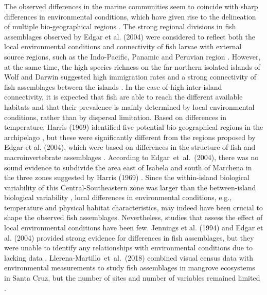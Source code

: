 \documentclass[jmse,article,accept,moreauthors,pdftex]{Definitions/mdpi}
\begin{document}
The observed differences in the marine communities seem to coincide with sharp differences in environmental conditions, which have given rise to the delineation of multiple bio-geographical regions \citep{Harris1969BreedingIslands,Jennings1994TheArchipelago}. The strong regional divisions in fish assemblages observed by Edgar et al. (2004) were considered to reflect both the local environmental conditions and connectivity of fish larvae with external source regions, such as the Indo-Pacific, Panamic and Peruvian region \cite{Edgar2004}. However, at the same time, the high species richness on the far-northern isolated islands of Wolf and Darwin suggested high immigration rates and a strong connectivity of fish assemblages between the islands \citep{Edgar2004}. In the case of high inter-island connectivity, it is expected that fish are able to reach the different available habitats and that their prevalence is mainly determined by local environmental conditions, rather than by dispersal limitation. Based on differences in temperature, Harris (1969) identified five potential bio-geographical regions in the archipelago \cite{Harris1969BreedingIslands}, but these were significantly different from the regions proposed by Edgar et al. (2004), which were based on differences in the structure of fish and macroinvertebrate assemblages \cite{Edgar2004}. According to \mbox{Edgar et al. (2004)}, there was no sound evidence to subdivide the area east of Isabela and south of Marchena in the three zones suggested by Harris (1969) \cite{Edgar2004,Harris1969BreedingIslands}. Since the within-island biological variability of this Central-Southeastern zone was larger than the between-island biological variability \citep{Edgar2004}, local differences in environmental conditions, e.g., temperature and physical habitat characteristics, may indeed have been crucial to shape the observed fish assemblages. Nevertheless, studies that assess the effect of local environmental conditions have been few. Jennings et al. (1994) and Edgar et al. (2004) provided strong evidence for differences in fish assemblages, but they were unable to identify any relationships with environmental conditions due to lacking data \cite{Edgar2004,Jennings1994TheArchipelago}. \mbox{Llerena-Martillo et al. (2018)} combined visual census data with environmental measurements to study fish assemblages in mangrove ecosystems in Santa Cruz, but the number of sites and number of variables remained limited \cite{Llerena-Martillo2018FishReserve}.
\end{document}
